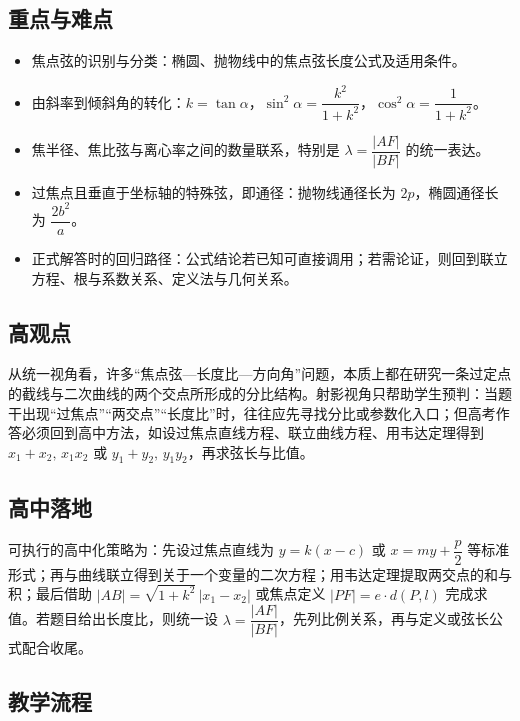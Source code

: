 \documentclass[UTF8,a4paper,11pt]{ctexart}
\begin{document}
\subsection*{重点与难点}

\begin{itemize}

\item 焦点弦的识别与分类：椭圆、抛物线中的焦点弦长度公式及适用条件。

\item 由斜率到倾斜角的转化：$k=\tan\alpha$，$\sin^2\alpha=\dfrac{k^2}{1+k^2}$，$\cos^2\alpha=\dfrac{1}{1+k^2}$。

\item 焦半径、焦比弦与离心率之间的数量联系，特别是 $\lambda=\dfrac{|AF|}{|BF|}$ 的统一表达。

\item 过焦点且垂直于坐标轴的特殊弦，即通径：抛物线通径长为 $2p$，椭圆通径长为 $\dfrac{2b^2}{a}$。

\item 正式解答时的回归路径：公式结论若已知可直接调用；若需论证，则回到联立方程、根与系数关系、定义法与几何关系。

\end{itemize}

\subsection*{高观点}

从统一视角看，许多“焦点弦—长度比—方向角”问题，本质上都在研究一条过定点的截线与二次曲线的两个交点所形成的分比结构。射影视角只帮助学生预判：当题干出现“过焦点”“两交点”“长度比”时，往往应先寻找分比或参数化入口；但高考作答必须回到高中方法，如设过焦点直线方程、联立曲线方程、用韦达定理得到 $x_1+x_2,\,x_1x_2$ 或 $y_1+y_2,\,y_1y_2$，再求弦长与比值。

\subsection*{高中落地}

可执行的高中化策略为：先设过焦点直线为 $y=k(x-c)$ 或 $x=my+\dfrac p2$ 等标准形式；再与曲线联立得到关于一个变量的二次方程；用韦达定理提取两交点的和与积；最后借助 $|AB|=\sqrt{1+k^2}\,|x_1-x_2|$ 或焦点定义 $|PF|=e\cdot d(P,l)$ 完成求值。若题目给出长度比，则统一设 $\lambda=\dfrac{|AF|}{|BF|}$，先列比例关系，再与定义或弦长公式配合收尾。

\subsection*{教学流程}
\end{document}
